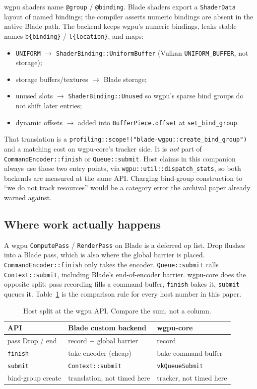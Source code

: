 \documentclass[10pt,twocolumn]{article}
\begin{document}
wgpu shaders name \texttt{@group} / \texttt{@binding}. Blade shaders
export a \texttt{ShaderData} layout of named bindings; the compiler
asserts numeric bindings are absent in the native Blade path. The
backend keeps wgpu's numeric bindings, leaks stable names
\texttt{b\{binding\}} / \texttt{l\{location\}}, and maps:

\begin{itemize}
  \item \texttt{UNIFORM} $\to$ \texttt{ShaderBinding::UniformBuffer}
        (Vulkan \texttt{UNIFORM\_BUFFER}, not storage);
  \item storage buffers/textures $\to$ Blade storage;
  \item unused slots $\to$ \texttt{ShaderBinding::Unused} so wgpu's
        sparse bind groups do not shift later entries;
  \item dynamic offsets $\to$ added into \texttt{BufferPiece.offset} at
        \texttt{set\_bind\_group}.
\end{itemize}

That translation is a \texttt{profiling::scope!("blade-wgpu::create\_bind\_group")}
and a matching cost on wgpu-core's tracker side. It is \emph{not} part of
\texttt{CommandEncoder::finish} or \texttt{Queue::submit}. Host claims in
this companion always use those two entry points, via
\texttt{wgpu::util::dispatch\_stats}, so both backends are measured at the
same API. Charging bind-group construction to ``we do not track
resources'' would be a category error the archival paper already warned
against.

\subsection{Where work actually happens}

A wgpu \texttt{ComputePass} / \texttt{RenderPass} on Blade is a deferred
op list. Drop flushes into a Blade pass, which is also where the global
barrier is placed. \texttt{CommandEncoder::finish} only takes the
encoder. \texttt{Queue::submit} calls \texttt{Context::submit}, including
Blade's end-of-encoder barrier. wgpu-core does the opposite split: pass
recording fills a command buffer, \texttt{finish} bakes it,
\texttt{submit} queues it. Table~\ref{tab:split} is the comparison rule
for every host number in this paper.

\begin{table}[t]
\centering
\caption{Host split at the wgpu API. Compare the sum, not a column.}
\label{tab:split}
\small
\begin{tabular}{@{}lll@{}}
\toprule
API & Blade custom backend & wgpu-core \\
\midrule
pass Drop / end & record + global barrier & record \\
\texttt{finish} & take encoder (cheap) & bake command buffer \\
\texttt{submit} & \texttt{Context::submit} & \texttt{vkQueueSubmit} \\
bind-group create & translation, not timed here & tracker, not timed here \\
\bottomrule
\end{tabular}
\end{table}
\end{document}
